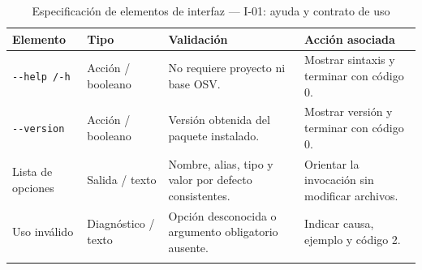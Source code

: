 \begin{table}[H]
\centering\small{}
\caption{Especificación de elementos de interfaz --- I-01: ayuda y contrato de uso}
\begin{tabularx}{\textwidth}{P{3.0cm}P{2.3cm}YY}
\toprule
\textbf{Elemento} & \textbf{Tipo} & \textbf{Validación} & \textbf{Acción asociada} \\
\midrule
\texttt{-\allowbreak -\allowbreak help /\allowbreak  -\allowbreak h} & Acción / booleano & No requiere proyecto ni base OSV. & Mostrar sintaxis y terminar con código 0. \\
\addlinespace
\texttt{-\allowbreak -\allowbreak version} & Acción / booleano & Versión obtenida del paquete instalado. & Mostrar versión y terminar con código 0. \\
\addlinespace
Lista de opciones & Salida / texto & Nombre, alias, tipo y valor por defecto consistentes. & Orientar la invocación sin modificar archivos. \\
\addlinespace
Uso inválido & Diagnóstico / texto & Opción desconocida o argumento obligatorio ausente. & Indicar causa, ejemplo y código 2. \\
\addlinespace
\bottomrule
\end{tabularx}
\end{table}



